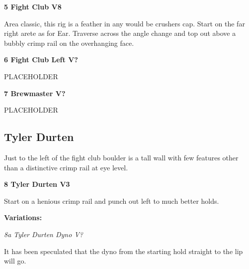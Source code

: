 \begin{multicols}{2}
					\begin{minipage}{\linewidth}	
					\label{rt:Fight Club}\colorbox{Goldenrod!50}{\textbf{5 Fight Club V8 \ding{72}    }}
					\begin{adjustwidth}{0.5cm}{}				
					Area classic, this rig is a feather in any would be crushers cap. Start on the far right arete as for Ear. Traverse across the angle change and top out above a bubbly crimp rail on the overhanging face.
					\end{adjustwidth}
					\end{minipage}
					\begin{minipage}{\linewidth}	
					\label{rt:Fight Club Left}\colorbox{black!20}{\textbf{6 Fight Club Left V?  }}
					\begin{adjustwidth}{0.5cm}{}				
					PLACEHOLDER
					\end{adjustwidth}
					\end{minipage}
					\begin{minipage}{\linewidth}	
					\label{rt:Brewmaster}\colorbox{black!20}{\textbf{7 Brewmaster V?  }}
					\begin{adjustwidth}{0.5cm}{}				
					PLACEHOLDER
					\end{adjustwidth}
					\end{minipage}
			\subsection*{Tyler Durten}\label{bf:Tyler Durten}
			\begin{minipage}{\columnwidth}
			Just to the left of the fight club boulder is a tall wall with few features other than a distinctive crimp rail at eye level.
			\end{minipage}
			
					\begin{minipage}{\linewidth}	
					\label{rt:Tyler Durten}\colorbox{green!20}{\textbf{8 Tyler Durten V3   }}
					\begin{adjustwidth}{0.5cm}{}				
					Start on a henious crimp rail and punch out left to much better holds.
					\end{adjustwidth}
					\end{minipage}
						\begin{adjustwidth}{0.5cm}{}				
						\textbf{Variations:} \newline
							\begin{minipage}{\linewidth}	
							\label{vr:Tyler Durten Dyno}\colorbox{black!20}{\emph{8a Tyler Durten Dyno V?  }}
							\begin{adjustwidth}{0.5cm}{}				
							It has been speculated that the dyno from the starting hold straight to the lip will go.
							\end{adjustwidth}
							\end{minipage}
						\end{adjustwidth}

\end{multicols}
